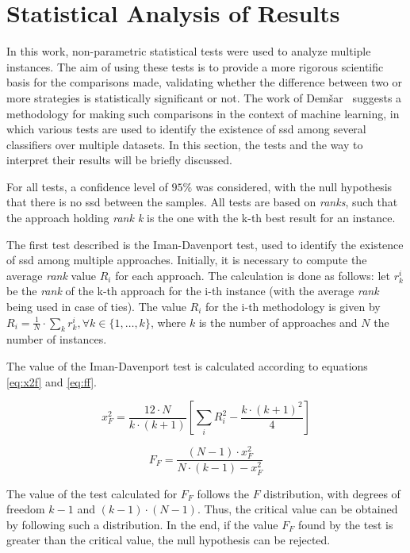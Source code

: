 \section{Statistical Analysis of Results}\label{subsec:statistical-analysis}

In this work, non-parametric statistical tests were used to analyze multiple instances. The aim of using these tests is to provide a more rigorous scientific basis for the comparisons made, validating whether the difference between two or more strategies is statistically significant or not. The work of Dem\v{s}ar~\cite{demsar:2006} suggests a methodology for making such comparisons in the context of machine learning, in which various tests are used to identify the existence of \gls{ssd} among several classifiers over multiple datasets. In this section, the tests and the way to interpret their results will be briefly discussed.

For all tests, a confidence level of $95\%$ was considered, with the null hypothesis that there is no \gls{ssd} between the samples. All tests are based on \textit{ranks}, such that the approach holding \textit{rank k} is the one with the k-th best result for an instance.

The first test described is the Iman-Davenport test, used to identify the existence of \gls{ssd} among multiple approaches. Initially, it is necessary to compute the average \textit{rank} value $R_i$ for each approach. The calculation is done as follows: let $r_k^i$ be the \textit{rank} of the k-th approach for the i-th instance (with the average \textit{rank} being used in case of ties). The value $R_i$ for the i-th methodology is given by $R_i = \frac{1}{N} \cdot \sum_{k} r_k^i, \forall k \in \{1, \dots, k\}$, where $k$ is the number of approaches and $N$ the number of instances.

The value of the Iman-Davenport test is calculated according to equations \eqref{eq:x2f} and \eqref{eq:ff}.

\begin{equation}
    x^2_F = \frac{12 \cdot N}{k \cdot (k + 1)} \left[ \sum_{i} R^2_{i} - \frac{k \cdot (k+1)^2}{4} \right] \label{eq:x2f}
\end{equation}

\begin{equation}
    F_F = \frac{(N - 1) \cdot x^2_F}{N \cdot (k - 1) - x^2_F} \label{eq:ff}
\end{equation}

The value of the test calculated for $F_F$ follows the $F$ distribution, with degrees of freedom $k - 1$ and $(k - 1) \cdot (N - 1)$. Thus, the critical value can be obtained by following such a distribution. In the end, if the value $F_F$ found by the test is greater than the critical value, the null hypothesis can be rejected.

